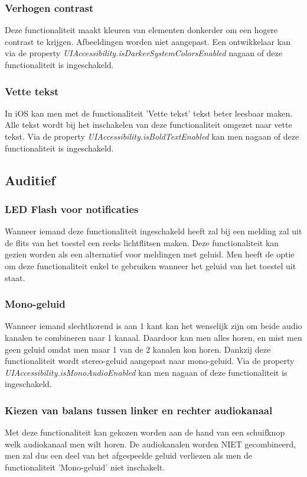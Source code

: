 \subsubsection{Verhogen contrast}
Deze functionaliteit maakt kleuren van elementen donkerder om een hogere contrast te krijgen. Afbeeldingen worden niet aangepast.
Een ontwikkelaar kan via de property \emph{UIAccessibility.isDarkerSystemColorsEnabled} nagaan of deze functionaliteit is ingeschakeld. 
\subsubsection{Vette tekst}
In iOS kan men met de functionaliteit 'Vette tekst' tekst beter leesbaar maken. Alle tekst wordt bij het inschakelen van deze functionaliteit omgezet naar vette tekst.
Via de property \emph{UIAccessibility.isBoldTextEnabled} kan men nagaan of deze functionaliteit is ingeschakeld. 
\subsection{Auditief}
\subsubsection{LED Flash voor notificaties}
Wanneer iemand deze functionaliteit ingeschakeld heeft zal bij een melding zal uit de flits van het toestel een reeks lichtflitsen maken. Deze functionaliteit kan gezien worden als een alternatief voor meldingen met geluid. Men heeft de optie om deze functionaliteit enkel te gebruiken wanneer het geluid van het toestel uit staat.
\subsubsection{Mono-geluid}
Wanneer iemand slechthorend is aan 1 kant kan het wenselijk zijn om beide audio kanalen te combineren naar 1 kanaal. Daardoor kan men alles horen, en mist men geen geluid omdat men maar 1 van de 2 kanalen kon horen. Dankzij deze functionaliteit wordt stereo-geluid aangepast naar mono-geluid.
Via de property \emph{UIAccessibility.isMonoAudioEnabled} kan men nagaan of deze functionaliteit is ingeschakeld.
\subsubsection{Kiezen van balans tussen linker en rechter audiokanaal}
Met deze functionaliteit kan gekozen worden aan de hand van een schuifknop welk audiokanaal men wilt horen. De audiokanalen worden NIET gecombineerd, men zal dus een deel van het afgespeelde geluid verliezen als men de functionaliteit 'Mono-geluid' niet inschakelt. 
